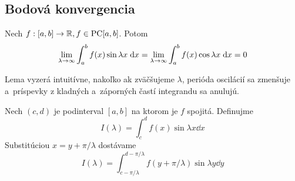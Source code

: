 
\subsection{Bodová konvergencia}
\begin{lema}
    Nech $f: [a,b]\rightarrow {\mathbb R}, f\in \mbox{PC}[a,b]$. Potom
    \begin{equation*}
        \lim_{\lambda\rightarrow\infty} \int_a^b f(x) \sin \lambda x \; \mathrm{d} x=
        \lim_{\lambda\rightarrow\infty} \int_a^b f(x) \cos \lambda x \; \mathrm{d} x=
        0
    \end{equation*}
\end{lema}

\begin{dokaz}
    Lema vyzerá intuitívne, nakoľko ak zväčšujeme $\lambda$,
    perióda oscilácií sa zmenšuje a~príspevky
    z kladných a~záporných častí integrandu sa anulujú.

    \def\pil{\pi/\lambda}

    Nech $(c,d)$ je podinterval $[a,b]$ na ktorom je $f$ spojitá.
    Definujme 
    \begin{equation}
        I(\lambda) = \int_c^d f(x) \sin \lambda x \dd x
        \label{eq:riem_leb_I1}
    \end{equation}
    Substitúciou $x=y+\pil$ dostávame
    \begin{equation}
        I(\lambda) = \int_{c-\pil}^{d-\pil}
            f \left(y+\pil\right) \sin \lambda y \dd y
        \label{eq:riem_leb_I2}
    \end{equation}


\end{dokaz}
